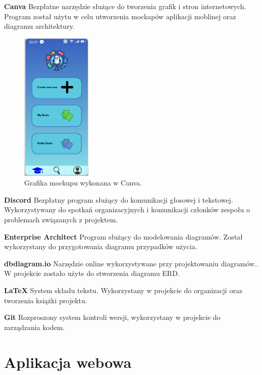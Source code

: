 \textbf{Canva} Bezpłatne narzędzie służące do tworzenia grafik i stron internetowych. Program został użytu w celu utworzenia mockapów aplikacji moblinej oraz diagramu architektury.

\begin{figure}[H]
    \centering
    \includegraphics[width=0.3\textwidth]{chapters/chapter_7/canva}
    \caption{Grafika mockupu wykonana w Canva.}
    \label{img:canva}
\end{figure}


\textbf{Discord} Bezpłatny program służący do komunikacji głosowej i tekstowej. Wykorzystywany do spotkań organizacyjnych i komunikacji członków zespołu o problemach związanych z projektem.

\medskip

\textbf{Enterprise Architect} Program służący do modelowania diagramów. Został wykorzystany do przygotowania diagramu przypadków użycia.

\medskip

\textbf{dbdiagram.io} Narzędzie online wykorzystywane przy projektowaniu diagramów.. W projekcie zostało użyte do stworzenia diagramu ERD.

\medskip

\textbf{LaTeX} System składu tekstu. Wykorzystany w projekcie do organizacji oraz tworzenia książki projektu.

\medskip

\textbf{Git} Rozproszony system kontroli wersji, wykorzystany w projekcie do zarządzania kodem.

\section{Aplikacja webowa}

